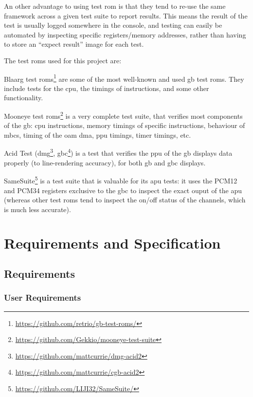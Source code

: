 \documentclass[11pt]{report}
\newcommand{\ftnt}[1]{\footnote{\url{#1}}}
\begin{document}
An other advantage to using test \gls{rom} is that they tend to re-use the same framework across a given test suite to report results. This means the result of the test is usually logged somewhere in the console, and testing can easily be automated by inspecting specific registers/memory addresses, rather than having to store an ``expect result'' image for each test.

The test \glspl{rom} used for this project are:

\begin{compactitem}
    \item Blaarg test \glspl{rom}\ftnt{https://github.com/retrio/gb-test-roms/} are some of the most well-known and used \gls{gb} test \glspl{rom}. They include tests for the \gls{cpu}, the timings of instructions, and some other functionality.
    \item Mooneye test \glspl{rom}\ftnt{https://github.com/Gekkio/mooneye-test-suite} is a very complete test suite, that verifies most components of the \gls{gb}: \gls{cpu} instructions, memory timings of specific instructions, behaviour of \glspl{mbc}, timing of the \gls{oam} \gls{dma}, \gls{ppu} timings, timer timings, etc.
    \item Acid Test (\gls{dmg}\ftnt{https://github.com/mattcurrie/dmg-acid2}, \gls{gbc}\ftnt{https://github.com/mattcurrie/cgb-acid2}) is a test that verifies the \gls{ppu} of the \gls{gb} displays data properly (to line-rendering accuracy), for both \glsdesc{gb} and \glsdesc{gbc} displays.
    \item SameSuite\ftnt{https://github.com/LIJI32/SameSuite/} is a test suite that is valuable for its \gls{apu} tests: it uses the PCM12 and PCM34 registers exclusive to the \gls{gbc} to inspect the exact ouput of the \gls{apu} (whereas other test \glspl{rom} tend to inspect the on/off status of the channels, which is much less accurate).
\end{compactitem}

\chapter{Requirements and Specification}

\section{Requirements}

\subsection{User Requirements}
\end{document}
